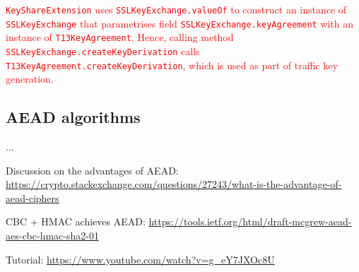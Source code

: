 \documentclass[envcountsame]{article}
\newcommand{\code}{\lstinline[style=inlinestyle]}
\begin{document}
\textcolor{red}{\code{KeyShareExtension} uses \code{SSLKeyExchange.valueOf} to 
  construct an instance of \code{SSLKeyExchange} that parametrises field 
  \code{SSLKeyExchange.keyAgreement} with an instance of \code{T13KeyAgreement}.
  Hence, calling method \code{SSLKeyExchange.createKeyDerivation} calls
  \code{T13KeyAgreement.createKeyDerivation}, which is used as part of 
  traffic key generation.}

\subsection{AEAD algorithms}\label{sec:aead}

...


Discussion on the advantages of AEAD: \url{https://crypto.stackexchange.com/questions/27243/what-is-the-advantage-of-aead-ciphers}

CBC + HMAC achieves AEAD: \url{https://tools.ietf.org/html/draft-mcgrew-aead-aes-cbc-hmac-sha2-01}

Tutorial: \url{https://www.youtube.com/watch?v=g_eY7JXOc8U}

\fi


%

\appendix
%







%
%
\end{document}
